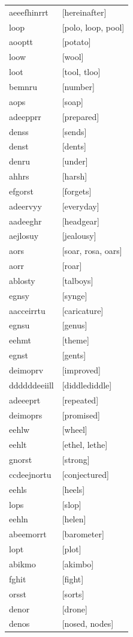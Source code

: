 \documentclass{article}
\begin{document}
\begin{tabular}{ll}
aeeefhinrrt & [hereinafter] \\
loop & [polo, loop, pool] \\
aooptt & [potato] \\
loow & [wool] \\
loot & [tool, tloo] \\
bemnru & [number] \\
aops & [soap] \\
adeepprr & [prepared] \\
denss & [sends] \\
denst & [dents] \\
denru & [under] \\
ahhrs & [harsh] \\
efgorst & [forgets] \\
adeervyy & [everyday] \\
aadeeghr & [headgear] \\
aejlosuy & [jealousy] \\
aors & [soar, rosa, oars] \\
aorr & [roar] \\
ablosty & [talboys] \\
egnsy & [synge] \\
aacceirrtu & [caricature] \\
egnsu & [genus] \\
eehmt & [theme] \\
egnst & [gents] \\
deimoprv & [improved] \\
ddddddeeiill & [diddlediddle] \\
adeeeprt & [repeated] \\
deimoprs & [promised] \\
eehlw & [wheel] \\
eehlt & [ethel, lethe] \\
gnorst & [strong] \\
ccdeejnortu & [conjectured] \\
eehls & [heels] \\
lops & [slop] \\
eehln & [helen] \\
abeemorrt & [barometer] \\
lopt & [plot] \\
abikmo & [akimbo] \\
fghit & [fight] \\
orsst & [sorts] \\
denor & [drone] \\
denos & [nosed, nodes] \\

\end{tabular}
\end{document}
